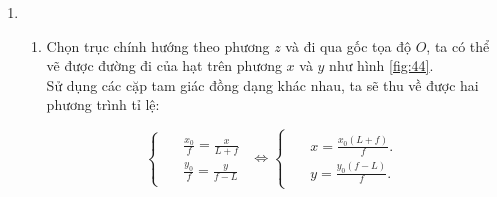 \begin{enumerate}
    \item
    \begin{enumerate}
    \item 
    Chọn trục chính hướng theo phương $z$ và đi qua gốc tọa độ $O$, ta có thể vẽ được đường đi của hạt trên phương $x$ và $y$ như hình \ref{fig:44}. \\

    Sử dụng các cặp tam giác đồng dạng khác nhau, ta sẽ thu về được hai phương trình tỉ lệ:

    \begin{equation}
        \begin{cases}
        \
        \begin{alignedat}{2}
            & \frac{x_0}{f} = \frac{x}{L+f}
            \\
            & \frac{y_0}{f} = \frac{y}{f-L}
        \end{alignedat}
        \end{cases}
        \iff
        \begin{cases}
        \
        \begin{alignedat}{2}
            & x =\frac{x_0(L+f)}{f}.
            \\
            & y = \frac{y_0 (f-L)}{f}.
        \end{alignedat}
        \end{cases}
    \end{equation}
    
        \begin{figure}[!ht]
        \centering
        \scalebox{0.75}{
        \begin{tikzpicture}[x=0.75pt,y=0.75pt,yscale=-1,xscale=1]
        

\end{tikzpicture}}
\end{figure}
\end{enumerate}
\end{enumerate}
